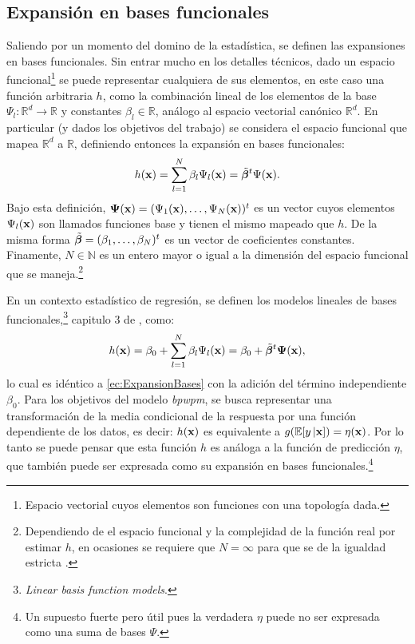 \documentclass[../Main/Main.tex]{subfiles}
\begin{document}
\subsection{Expansión en bases funcionales}
Saliendo por un momento del domino de la estadística, se definen las expansiones en bases funcionales. Sin entrar mucho en los detalles técnicos, dado un espacio funcional\footnote{Espacio vectorial cuyos elementos son funciones con una topología dada.} se puede representar cualquiera de sus elementos, en este caso una función arbitraria $h$, como la combinación lineal de los elementos de la base $\Psi_l:\mathbb{R} ^d\rightarrow\mathbb{R}$  y constantes $\beta_l\in\mathbb{R}$, análogo al espacio vectorial canónico $\mathbb{R}^d$. En particular (y dados los objetivos del trabajo) se considera el espacio funcional que mapea $\mathbb{R}^d$ a $\mathbb{R}$, definiendo entonces la expansión en bases funcionales: 
\begin{align} 
	h(\mathbf{x}) = \sum_{l = 1}^{N}\beta_l\Psi_l(\mathbf{x}) = \tilde{\bm{\beta}}^t\Psi(\mathbf{x}). \label{ec:ExpansionBases}
\end{align}
Bajo esta definición, $\bm{\Psi}(\mathbf{x}) = (\Psi_1(\mathbf{x}),\ldots,\Psi_{N}(\mathbf{x}))^t$ es un vector cuyos elementos $\Psi_l(\mathbf{x})$ son llamados funciones base y tienen el mismo mapeado que $h$. De la misma forma $\tilde{\bm{\beta}} = (\beta_1,\ldots,\beta_{N})^t$ es un vector de coeficientes constantes. Finamente, $N\in\mathbb{N}$ es un entero mayor o igual a la dimensión del espacio funcional que se maneja.\footnote{Dependiendo de el espacio funcional y la complejidad de la función real por estimar $h$, en ocasiones se requiere que $N = \infty$ para que se de la igualdad estricta \autocite{bergstrom1985estimation}.}

En un contexto estadístico de regresión, se definen los modelos lineales de bases funcionales,\footnote{\textit{Linear basis function models}.} capitulo 3 de \citet{bishop2006pattern}, como:
\begin{align} 
	h(\mathbf{x}) = \beta_0 + \sum_{l = 1}^{N} \beta_l\Psi_l(\mathbf{x}) = \beta_0 + \tilde{\bm{\beta}}^t\bm{\Psi}(\mathbf{x}), \label{ec:LBFM}
\end{align}
lo cual es idéntico a \eqref{ec:ExpansionBases} con la adición del término independiente $\beta_0$. Para los objetivos del modelo \textit{bpwpm}, se busca representar una transformación de la media condicional de la respuesta por una función dependiente de los datos, es decir: $h(\mathbf{x})$ es equivalente a $g(\mathbb{E}[y\,|\mathbf{x}]) = \eta(\mathbf{x})$. Por lo tanto se puede pensar que esta función $h$ es análoga a la función de predicción $\eta$, que también puede ser expresada como su expansión en bases funcionales.\footnote{Un supuesto fuerte pero útil pues la verdadera $\eta$ puede no ser expresada como una suma de bases $\Psi$.} 
\end{document}
